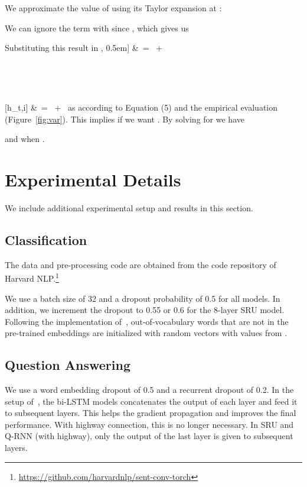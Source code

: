 \documentclass[11pt,a4paper]{article}
\begin{document}
We approximate the value of  using its Taylor expansion at :

We can ignore the term with  since , which gives us

Substituting this result in ,
0.5em]
&\ =\  + 

\ \leq\ \ \leq\ 

\ \leq\ \ \leq\ 

[h_{t,i}] &\ =\  +  \
as  according to Equation (5) and the empirical evaluation (Figure~\ref{fig:var}).
This implies  if we want .
By solving for  we have

and  when .

\section{Experimental Details}
\label{sec:appendix:experiments}
We include additional experimental setup and results in this section.

\subsection{Classification}
The data and pre-processing code are obtained from the code repository of Harvard NLP.\footnote{\url{https://github.com/harvardnlp/sent-conv-torch}}

We use a batch size of 32 and a dropout probability of 0.5 for all models.
In addition, we increment the dropout to 0.55 or 0.6 for the 8-layer SRU model.
Following the implementation of~\citep{Kim14}, out-of-vocabulary words that are not in the pre-trained embeddings are initialized with random vectors with values from .

\subsection{Question Answering}
We use a word embedding dropout of 0.5 and a recurrent dropout of 0.2.
In the setup of~\citet{chen2017reading}, the bi-LSTM models concatenates the output of each layer and feed it to subsequent layers.
This helps the gradient propagation and improves the final performance.
With highway connection, this is no longer necessary.
In SRU and Q-RNN (with highway), only the output of the last layer is given to subsequent layers.
\end{document}
